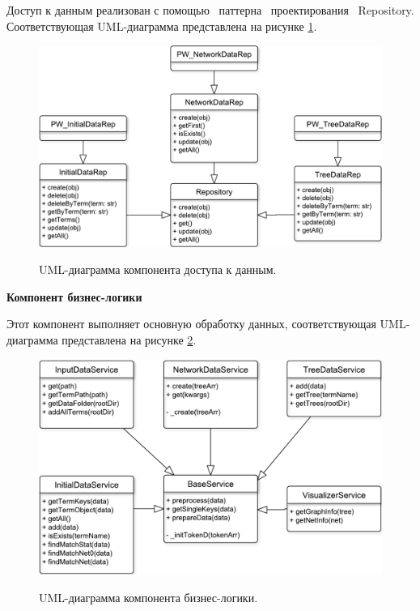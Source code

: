 Доступ к данным реализован с помощью \, паттерна \, проектирования \, Repository. Соответствующая UML-диаграмма представлена на рисунке \ref{fig49:image}.
\begin{figure}[h!]
	\begin{center}
		{\includegraphics[scale = 0.6]{img/uml/pdf/uml_rep.pdf}}
		\caption{UML-диаграмма компонента доступа к данным.}
		\label{fig49:image}
	\end{center}
\end{figure}

\textbf{Компонент бизнес-логики}

Этот компонент выполняет основную обработку данных, соответствующая UML-диаграмма представлена на рисунке \ref{fig50:image}.
\begin{figure}[h!]
	\begin{center}
		{\includegraphics[scale = 0.6]{img/uml/pdf/uml_ser.pdf}}
		\caption{UML-диаграмма компонента бизнес-логики.}
		\label{fig50:image}
	\end{center}
\end{figure}

